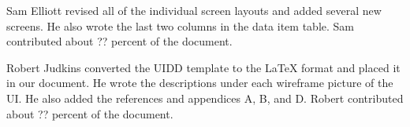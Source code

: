 \documentclass{article}
\begin{document}
Sam Elliott revised all of the individual screen layouts and added several new screens. He also wrote the last two columns in the data item table. Sam contributed about ?? percent of the document.

Robert Judkins converted the UIDD template to the LaTeX format and placed it in our document. He wrote the descriptions under each wireframe picture of the UI. He also added the references and appendices A, B, and D. Robert contributed about ?? percent of the document.

\newpage



\end{document}
